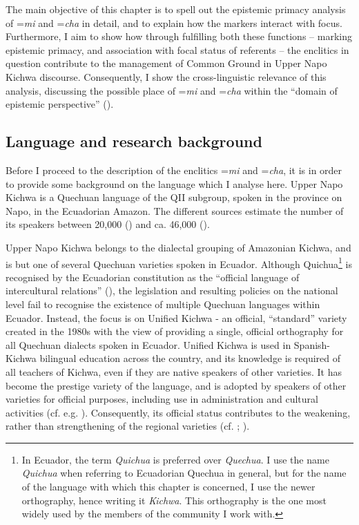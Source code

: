 \documentclass[output=paper]{langscibook}
\begin{document}
The main objective of this chapter is to spell out the epistemic primacy analysis of =\textit{mi} and =\textit{cha} in detail, and to explain how the markers interact with focus. Furthermore, I aim to show how through fulfilling both these functions – marking epistemic primacy, and association with focal status of referents – the enclitics in question contribute to the management of Common Ground in Upper Napo Kichwa discourse. Consequently, I show the cross-linguistic relevance of this analysis, discussing the possible place of =\textit{mi} and =\textit{cha} within the “domain of  epistemic perspective” (\citealt{Bergqvist2017}).


\subsection{Language and research background}\label{s:kg1-2}

Before I proceed to the description of the enclitics =\textit{mi} and =\textit{cha}, it is in order to provide some background on the language which I analyse here. Upper Napo Kichwa is a Quechuan language of the QII subgroup, spoken in the province on Napo, in the Ecuadorian Amazon. The different sources estimate the number of its speakers between 20,000 (\citealt{Ethnologue2016}) and ca. 46,000 (\citealt{INEC2010}). 

Upper Napo Kichwa belongs to the dialectal grouping of Amazonian Kichwa, and is but one of several Quechuan varieties spoken in Ecuador. Although Quichua\footnote{In Ecuador, the term \textit{Quichua} is preferred over \textit{Quechua}. I use the name \textit{Quichua} when referring to Ecuadorian Quechua in general, but for the name of the language with which this chapter is concerned, I use the newer orthography, hence writing it \textit{Kichwa}. This orthography is the one most widely used by the members of the community I work with.} is recognised by the Ecuadorian constitution as the “official language of intercultural relations” (\citealt{ANCE2008}), the legislation and resulting policies on the national level fail to recognise the existence of multiple Quechuan languages within Ecuador. 
Instead, the focus is on Unified Kichwa - an official, “standard” variety created in the 1980s with the view of providing a single, official orthography for all Quechuan dialects spoken in Ecuador. 
Unified Kichwa is used in Spanish-Kichwa bilingual education across the country, and its knowledge is required of all teachers of Kichwa, even if they are native speakers of other varieties. It has become the prestige variety of the language, and is adopted by speakers of other varieties for official purposes, including use in administration and cultural activities (cf. e.g. \citealt{Wroblewski2014}). Consequently, its official status contributes to the weakening, rather than strengthening of the regional varieties (cf. \citealt{Hornberger1996}; \citealt{Grzech2017}). 
\end{document}
